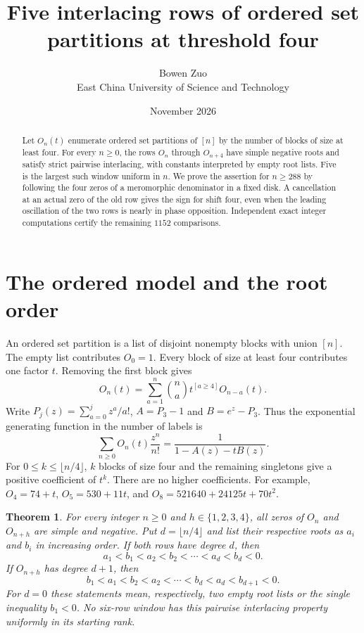 \documentclass[11pt]{article}
\title{Five interlacing rows of ordered set partitions at threshold four}
\author{Bowen Zuo\\East China University of Science and Technology}
\date{November 2026}
\newtheorem{theorem}{Theorem}
\begin{document}
\maketitle

\begin{abstract}
Let $O_n(t)$ enumerate ordered set partitions of $[n]$ by the number of
blocks of size at least four. For every $n\ge0$, the rows $O_n$ through
$O_{n+4}$ have simple negative roots and satisfy strict pairwise
interlacing, with constants interpreted by empty root lists. Five is the
largest such window uniform in $n$. We prove the assertion for $n\ge288$
by following the four zeros of a meromorphic denominator in a fixed
disk. A cancellation at an actual zero of the old row gives the sign
for shift four, even when the leading oscillation of the two rows is
nearly in phase opposition. Independent exact integer computations
certify the remaining $1152$ comparisons.
\end{abstract}

\section{The ordered model and the root order}
An ordered set partition is a list of disjoint nonempty blocks with
union $[n]$. The empty list contributes $O_0=1$. Every block of size at
least four contributes one factor $t$. Removing the first block gives
\begin{equation}\label{eq:recurrence}
 O_n(t)=\sum_{a=1}^n \binom{n}{a} t^{[a\ge4]} O_{n-a}(t).
\end{equation}
Write $P_j(z)=\sum_{a=0}^j z^a/a!$, $A=P_3-1$ and $B=e^z-P_3$.
Thus the exponential generating function in the number of labels is
\begin{equation}\label{eq:egf}
 \sum_{n\ge0}O_n(t)\frac{z^n}{n!}=\frac{1}{1-A(z)-tB(z)}.
\end{equation}
For $0\le k\le\lfloor n/4\rfloor$, $k$ blocks of size four and the
remaining singletons give a positive coefficient of $t^k$.
There are no higher coefficients. For example,
$O_4=74+t$, $O_5=530+11t$, and $O_8=521640+24125t+70t^2$.

\begin{theorem}\label{thm:main}
For every integer $n\ge0$ and $h\in\{1,2,3,4\}$, all zeros of $O_n$
and $O_{n+h}$ are simple and negative. Put $d=\lfloor n/4\rfloor$
and list their respective roots as $a_i$ and $b_i$ in increasing
order. If both rows have degree $d$, then
\[
 a_1<b_1<a_2<b_2<\cdots<a_d<b_d<0 .
\]
If $O_{n+h}$ has degree $d+1$, then
\[
 b_1<a_1<b_2<a_2<\cdots<b_d<a_d<b_{d+1}<0 .
\]
For $d=0$ these statements mean, respectively, two empty root lists
or the single inequality $b_1<0$. No six-row window has this
pairwise interlacing property uniformly in its starting rank.
\end{theorem}
\end{document}
